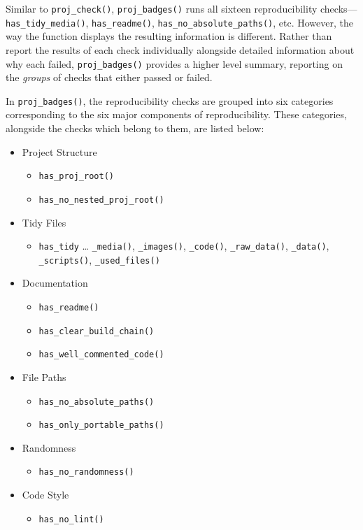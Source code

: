 \documentclass[12pt,twoside]{reedthesis}
\providecommand{\tightlist}{%
  \setlength{\itemsep}{0pt}\setlength{\parskip}{0pt}}
\begin{document}
Similar to \texttt{proj\_check()}, \texttt{proj\_badges()} runs all sixteen reproducibility checks---\texttt{has\_tidy\_media()}, \texttt{has\_readme()}, \texttt{has\_no\_absolute\_paths()}, etc. However, the way the function displays the resulting information is different. Rather than report the results of each check individually alongside detailed information about why each failed, \texttt{proj\_badges()} provides a higher level summary, reporting on the \emph{groups} of checks that either passed or failed.

In \texttt{proj\_badges()}, the reproducibility checks are grouped into six categories corresponding to the six major components of reproducibility. These categories, alongside the checks which belong to them, are listed below:
\begin{itemize}
\tightlist
\item
  Project Structure
  \begin{itemize}
  \tightlist
  \item
    \texttt{has\_proj\_root()}
  \item
    \texttt{has\_no\_nested\_proj\_root()}
  \end{itemize}
\item
  Tidy Files
  \begin{itemize}
  \tightlist
  \item
    \texttt{has\_tidy} \ldots{} \texttt{\_media()}, \texttt{\_images()}, \texttt{\_code()}, \texttt{\_raw\_data()}, \texttt{\_data()}, \texttt{\_scripts()}, \texttt{\_used\_files()}
  \end{itemize}
\item
  Documentation
  \begin{itemize}
  \tightlist
  \item
    \texttt{has\_readme()}
  \item
    \texttt{has\_clear\_build\_chain()}
  \item
    \texttt{has\_well\_commented\_code()}
  \end{itemize}
\item
  File Paths
  \begin{itemize}
  \tightlist
  \item
    \texttt{has\_no\_absolute\_paths()}
  \item
    \texttt{has\_only\_portable\_paths()}
  \end{itemize}
\item
  Randomness
  \begin{itemize}
  \tightlist
  \item
    \texttt{has\_no\_randomness()}
  \end{itemize}
\item
  Code Style
  \begin{itemize}
  \tightlist
  \item
    \texttt{has\_no\_lint()}
  \end{itemize}
\end{itemize}
\end{document}
